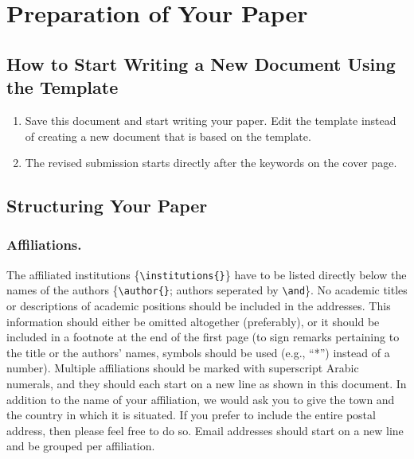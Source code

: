 \documentclass{llncs}
\begin{document}
\section{Preparation of Your Paper}
\label{sec:theoretical_background}
\subsection{How to Start Writing a New Document Using the Template}
\begin{enumerate}
    \item Save this document and start writing your paper. Edit the template instead of creating a new document that is based on the template.
    \item The revised submission starts directly after the keywords on the cover page.
\end{enumerate}

\subsection{Structuring Your Paper}
\subsubsection{Affiliations.} The affiliated institutions \{\verb|\institutions{}|\} have to be listed directly below the names of the authors \{\verb|\author{}|; authors seperated by \verb|\and|\}. 
No academic titles or descriptions of academic positions should be included in the addresses. 
This information should either be omitted altogether (preferably), or it should be included in a footnote at the end of the first page (to sign remarks pertaining to the title or the authors’ names, symbols should be used (e.g., “*”) instead of a number). 
Multiple affiliations should be marked with superscript Arabic numerals, and they should each start on a new line as shown in this document. 
In addition to the name of your affiliation, we would ask you to give the town and the country in which it is situated. 
If you prefer to include the entire postal address, then please feel free to do so. 
Email addresses should start on a new line and be grouped per affiliation.
\end{document}

